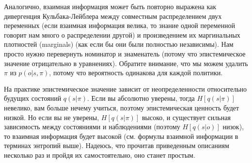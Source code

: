\documentclass[12pt]{article}
\begin{document}
\begin{figure}[h]
\end{figure}

Аналогично, взаимная информация может быть повторно выражена как дивергенция Кульбака-Лейблера между совместным распределением двух переменных (если взаимная информация велика, то знание одной переменной говорит нам много о распределении другой) и произведением их маргинальных плотностей (marginals) (как если бы они были полностью независимы). Нам просто нужно перевернуть номинатор и знаменатель (потому что эпистемическое значение отрицательно в уравнениях). Обратите внимание, что мы можем удалить $\pi$ из $p(o|s,\pi)$, потому что вероятность одинакова для каждой политики.


\begin{figure}[h]
\end{figure}

На практике эпистемическое значение зависит от неопределенности относительно будущих состояний $q(s|\pi)$. Если вы абсолютно уверены, тогда $H[q(s|\pi)]$ невелико, вам больше нечему учиться, поэтому эпистемическая ценность будет низкой. Но если вы не уверены, $H[q(s|\pi)]$ высоко, и существует сильная зависимость между состояниями и наблюдениями (поэтому $H[q(s|o)]$ низок), то взаимная информация будет высокой (см. формулы взаимной информации в терминах энтропий выше). Надеюсь, что прочитав приведенным описаниям несколько раз и пройдя их самостоятельно, оно станет простым.
\end{document}
